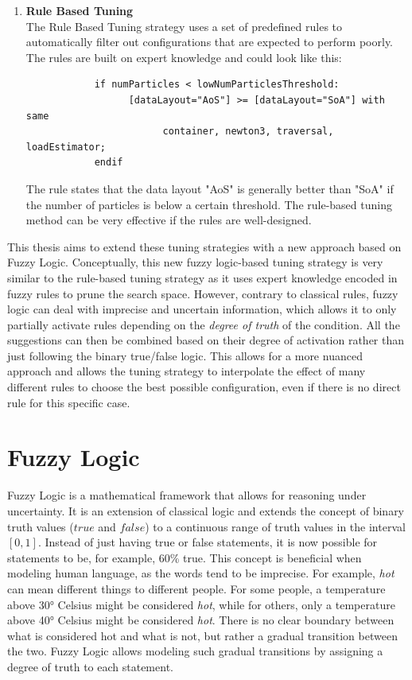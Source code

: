 \begin{enumerate}
      \item \textbf{Rule Based Tuning} \\
            The Rule Based Tuning strategy uses a set of predefined rules to automatically filter out configurations that are expected to perform poorly. The rules are built on expert knowledge and could look like this:
            \begin{small}
                  \begin{verbatim}
            if numParticles < lowNumParticlesThreshold:
                  [dataLayout="AoS"] >= [dataLayout="SoA"] with same 
                        container, newton3, traversal, loadEstimator;
            endif
            \end{verbatim}
            \end{small}
            The rule states that the data layout "AoS" is generally better than "SoA" if the number of particles is below a certain threshold. The rule-based tuning method can be very effective if the rules are well-designed.
\end{enumerate}


This thesis aims to extend these tuning strategies with a new approach based on Fuzzy Logic. Conceptually, this new fuzzy logic-based tuning strategy is very similar to the rule-based tuning strategy as it uses expert knowledge encoded in fuzzy rules to prune the search space. However, contrary to classical rules, fuzzy logic can deal with imprecise and uncertain information, which allows it to only partially activate rules depending on the \emph{degree of truth} of the condition.
All the suggestions can then be combined based on their degree of activation rather than just following the binary true/false logic. This allows for a more nuanced approach and allows the tuning strategy to interpolate the effect of many different rules to choose the best possible configuration, even if there is no direct rule for this specific case.

\section{Fuzzy Logic}

Fuzzy Logic is a mathematical framework that allows for reasoning under uncertainty. It is an extension of classical logic and extends the concept of binary truth values ($true$ and $false$) to a continuous range of truth values in the interval $[0, 1]$. Instead of just having true or false statements, it is now possible for statements to be, for example, 60\% true. This concept is beneficial when modeling human language, as the words tend to be imprecise. For example, \emph{hot} can mean different things to different people. For some people, a temperature above 30° Celsius might be considered \emph{hot}, while for others, only a temperature above 40° Celsius might be considered \emph{hot}. There is no clear boundary between what is considered hot and what is not, but rather a gradual transition between the two. Fuzzy Logic allows modeling such gradual transitions by assigning a degree of truth to each statement.

